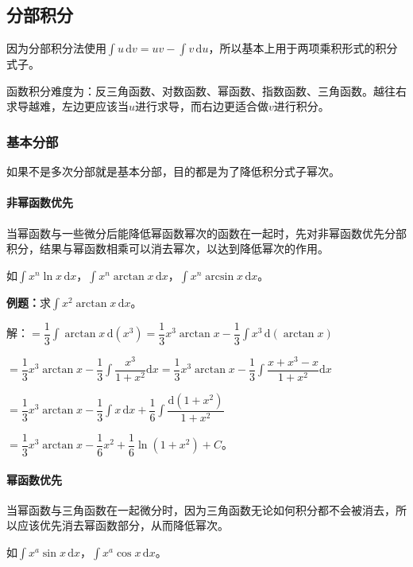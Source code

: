 \documentclass[UTF8, 12pt]{ctexart}
\begin{document}
\subsection{分部积分}

因为分部积分法使用$\int u\,\textrm{d}v=uv-\int v\,\textrm{d}u$，所以基本上用于两项乘积形式的积分式子。

函数积分难度为：反三角函数、对数函数、幂函数、指数函数、三角函数。越往右求导越难，左边更应该当$u$进行求导，而右边更适合做$v$进行积分。

\subsubsection{基本分部}

如果不是多次分部就是基本分部，目的都是为了降低积分式子幂次。

\paragraph{非幂函数优先} \leavevmode \medskip

当幂函数与一些微分后能降低幂函数幂次的函数在一起时，先对非幂函数优先分部积分，结果与幂函数相乘可以消去幂次，以达到降低幂次的作用。

如$\int x^n\ln x\,\textrm{d}x$，$\int x^n\arctan x\,\textrm{d}x$，$\int x^n\arcsin x\,\textrm{d}x$。

\textbf{例题：}求$\int x^2\arctan x\,\textrm{d}x$。

解：$=\dfrac{1}{3}\int\arctan x\,\textrm{d}(x^3)=\dfrac{1}{3}x^3\arctan x-\dfrac{1}{3}\int x^3\,\textrm{d}(\arctan x)$

$=\dfrac{1}{3}x^3\arctan x-\dfrac{1}{3}\displaystyle{\int\dfrac{x^3}{1+x^2}\textrm{d}x}=\dfrac{1}{3}x^3\arctan x-\dfrac{1}{3}\displaystyle{\int\dfrac{x+x^3-x}{1+x^2}\textrm{d}x}$

$=\dfrac{1}{3}x^3\arctan x-\dfrac{1}{3}\int x\,\textrm{d}x+\displaystyle{\dfrac{1}{6}\int\dfrac{\textrm{d}(1+x^2)}{1+x^2}}$

$=\dfrac{1}{3}x^3\arctan x-\dfrac{1}{6}x^2+\dfrac{1}{6}\ln(1+x^2)+C$。

\paragraph{幂函数优先} \leavevmode \medskip

当幂函数与三角函数在一起微分时，因为三角函数无论如何积分都不会被消去，所以应该优先消去幂函数部分，从而降低幂次。

如$\int x^a\sin x\,\textrm{d}x$，$\int x^a\cos x\,\textrm{d}x$。
\end{document}
